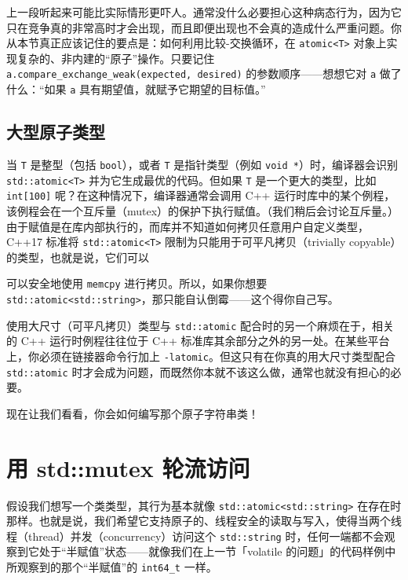 上一段听起来可能比实际情形更吓人。通常没什么必要担心这种病态行为，因为它只在竞争真的非常高时才会出现，而且即便出现也不会真的造成什么严重问题。你从本节真正应该记住的要点是：如何利用比较-交换循环，在 \texttt{atomic<\allowbreak{}T>\allowbreak{}} 对象上实现复杂的、非内建的“原子”操作。只要记住 \texttt{a.\allowbreak{}compare\_\allowbreak{}exchange\_\allowbreak{}weak(\allowbreak{}expected,\allowbreak{} desired)\allowbreak{}} 的参数顺序——想想它对 \texttt{a} 做了什么：“如果 \texttt{a} 具有期望值，就赋予它期望的目标值。”

\subsection{大型原子类型}

当 \texttt{T} 是整型（包括 \texttt{bool}），或者 \texttt{T} 是指针类型（例如 \texttt{void *}）时，编译器会识别 \texttt{std::\allowbreak{}atomic<\allowbreak{}T>\allowbreak{}} 并为它生成最优的代码。但如果 \texttt{T} 是一个更大的类型，比如 \texttt{int[100]} 呢？在这种情况下，编译器通常会调用 C++ 运行时库中的某个例程，该例程会在一个互斥量（mutex）的保护下执行赋值。（我们稍后会讨论互斥量。）由于赋值是在库内部执行的，而库并不知道如何拷贝任意用户自定义类型，C++17 标准将 \texttt{std::\allowbreak{}atomic<\allowbreak{}T>\allowbreak{}} 限制为只能用于可平凡拷贝（trivially copyable）的类型，也就是说，它们可以

可以安全地使用 \texttt{memcpy} 进行拷贝。所以，如果你想要 \texttt{std::\allowbreak{}atomic<\allowbreak{}std::\allowbreak{}string>\allowbreak{}}，那只能自认倒霉——这个得你自己写。

使用大尺寸（可平凡拷贝）类型与 \texttt{std::\allowbreak{}atomic} 配合时的另一个麻烦在于，相关的 C++ 运行时例程往往位于 C++ 标准库其余部分之外的另一处。在某些平台上，你必须在链接器命令行加上 \texttt{-latomic}。但这只有在你真的用大尺寸类型配合 \texttt{std::\allowbreak{}atomic} 时才会成为问题，而既然你本就不该这么做，通常也就没有担心的必要。

现在让我们看看，你会如何编写那个原子字符串类！

\section{用 std::mutex 轮流访问}

假设我们想写一个类类型，其行为基本就像 \texttt{std::\allowbreak{}atomic<\allowbreak{}std::\allowbreak{}string>\allowbreak{}} 在存在时那样。也就是说，我们希望它支持原子的、线程安全的读取与写入，使得当两个线程（thread）并发（concurrency）访问这个 \texttt{std::\allowbreak{}string} 时，任何一端都不会观察到它处于“半赋值”状态——就像我们在上一节「volatile 的问题」的代码样例中所观察到的那个“半赋值”的 \texttt{int64\_\allowbreak{}t} 一样。


